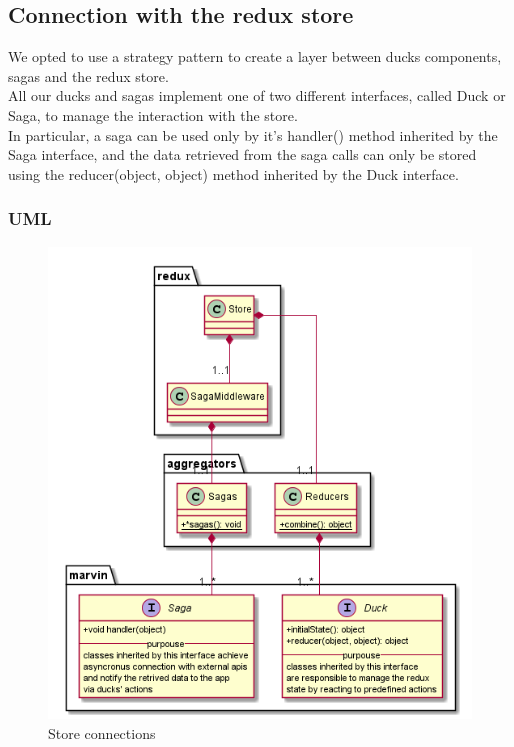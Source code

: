 
	\subsection{Connection with the redux store}
	We opted to use a strategy pattern to create a layer between ducks components, sagas and the redux store.\\
	All our ducks and sagas implement one of two different interfaces, called Duck or Saga, to manage the interaction with the store.\\
	In particular, a saga can be used only by it's handler() method inherited by the Saga interface,
	and the data retrieved from the saga calls can only be stored using the reducer(object, object) method inherited by the Duck interface.
	\subsubsection{UML}
	\begin{figure}[h]
		\centering
		\includegraphics[width=0.5\linewidth]{"diagrammi/redux/store connection"}
		\caption{Store connections}
		\label{fig:Store connections}
	\end{figure}
	
